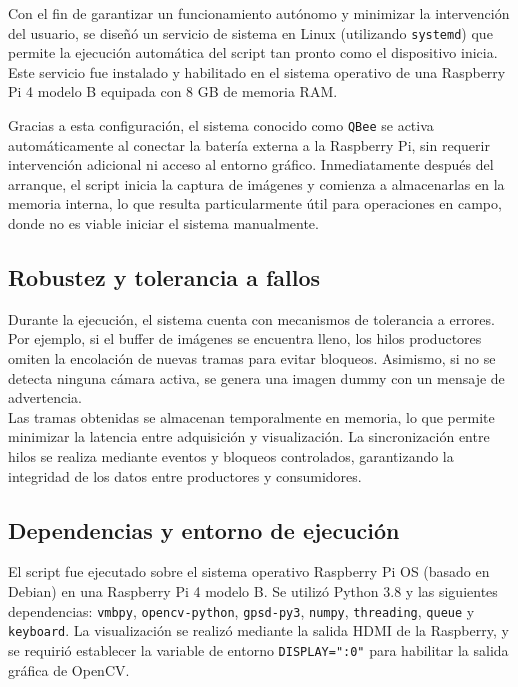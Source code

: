   Con el fin de garantizar un funcionamiento autónomo y minimizar la intervención del usuario, se diseñó un servicio de sistema en Linux (utilizando \texttt{systemd}) que permite la ejecución automática del script tan pronto como el dispositivo inicia. Este servicio fue instalado y habilitado en el sistema operativo de una Raspberry Pi 4 modelo B equipada con 8 GB de memoria RAM.
  
  Gracias a esta configuración, el sistema conocido como \texttt{QBee} se activa automáticamente al conectar la batería externa a la Raspberry Pi, sin requerir intervención adicional ni acceso al entorno gráfico. Inmediatamente después del arranque, el script inicia la captura de imágenes y comienza a almacenarlas en la memoria interna, lo que resulta particularmente útil para operaciones en campo, donde no es viable iniciar el sistema manualmente.
  
  \subsection{Robustez y tolerancia a fallos}
  
  Durante la ejecución, el sistema cuenta con mecanismos de tolerancia a errores. Por ejemplo, si el buffer de imágenes se encuentra lleno, los hilos productores omiten la encolación de nuevas tramas para evitar bloqueos. Asimismo, si no se detecta ninguna cámara activa, se genera una imagen dummy con un mensaje de advertencia.\\
  
  Las tramas obtenidas se almacenan temporalmente en memoria, lo que permite minimizar la latencia entre adquisición y visualización. La sincronización entre hilos se realiza mediante eventos y bloqueos controlados, garantizando la integridad de los datos entre productores y consumidores.
  
  \subsection{Dependencias y entorno de ejecución}
  
  El script fue ejecutado sobre el sistema operativo Raspberry Pi OS (basado en Debian) en una Raspberry Pi 4 modelo B. Se utilizó Python 3.8 y las siguientes dependencias: \texttt{vmbpy}, \texttt{opencv-python}, \texttt{gpsd-py3}, \texttt{numpy}, \texttt{threading}, \texttt{queue} y \texttt{keyboard}. La visualización se realizó mediante la salida HDMI de la Raspberry, y se requirió establecer la variable de entorno \texttt{DISPLAY=":0"} para habilitar la salida gráfica de OpenCV.

